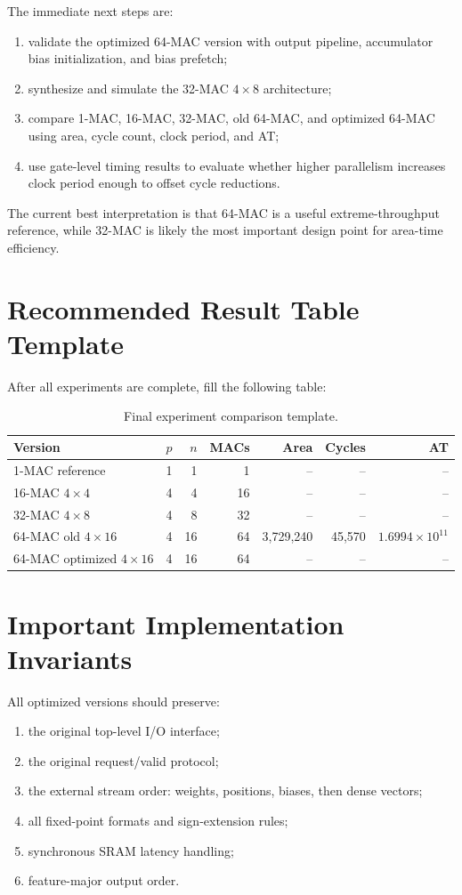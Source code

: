 \documentclass[11pt,a4paper]{article}
\begin{document}
The immediate next steps are:
\begin{enumerate}[nosep]
    \item validate the optimized 64-MAC version with output pipeline, accumulator bias initialization, and bias prefetch;
    \item synthesize and simulate the 32-MAC $4 \times 8$ architecture;
    \item compare 1-MAC, 16-MAC, 32-MAC, old 64-MAC, and optimized 64-MAC using area, cycle count, clock period, and AT;
    \item use gate-level timing results to evaluate whether higher parallelism increases clock period enough to offset cycle reductions.
\end{enumerate}

The current best interpretation is that 64-MAC is a useful extreme-throughput reference, while 32-MAC is likely the most important design point for area-time efficiency.

\appendix
\section{Recommended Result Table Template}

After all experiments are complete, fill the following table:

\begin{table}[H]
\centering
\caption{Final experiment comparison template.}
\begin{tabular}{lrrrrrr}
\toprule
Version & $p$ & $n$ & MACs & Area & Cycles & AT \\
\midrule
1-MAC reference & 1 & 1 & 1 & -- & -- & -- \\
16-MAC $4\times4$ & 4 & 4 & 16 & -- & -- & -- \\
32-MAC $4\times8$ & 4 & 8 & 32 & -- & -- & -- \\
64-MAC old $4\times16$ & 4 & 16 & 64 & 3,729,240 & 45,570 & $1.6994\times10^{11}$ \\
64-MAC optimized $4\times16$ & 4 & 16 & 64 & -- & -- & -- \\
\bottomrule
\end{tabular}
\end{table}

\section{Important Implementation Invariants}

All optimized versions should preserve:
\begin{enumerate}[nosep]
    \item the original top-level I/O interface;
    \item the original request/valid protocol;
    \item the external stream order: weights, positions, biases, then dense vectors;
    \item all fixed-point formats and sign-extension rules;
    \item synchronous SRAM latency handling;
    \item feature-major output order.
\end{enumerate}
\end{document}
